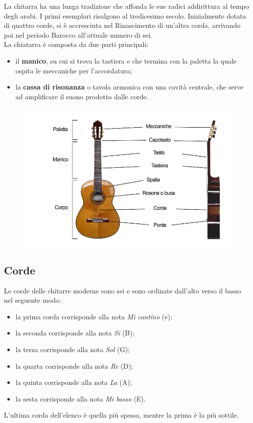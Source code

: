 La chitarra ha una lunga tradizione che affonda le sue radici addirittura al tempo degli arabi. I primi esemplari risalgono al tredicesimo secolo. Inizialmente dotata di quattro corde, si è accresciuta nel Rinascimento di un'altra corda, arrivando poi nel periodo Barocco all'attuale numero di sei.\\
\newline
La chiatarra è composta da due parti principali:
\begin{itemize}
	\item il \textbf{manico}, su cui si trova la tastiera e che termina con la paletta la quale ospita le meccaniche per l'accordatura;
	\item la \textbf{cassa di risonanza} o tavola armonica con una cavità centrale, che serve ad amplificare il suono prodotto dalle corde.
\end{itemize}

\begin{figure}[H]
	\centering
	\includegraphics[scale=0.50]{./images/img14.jpg}
\end{figure}

\subsection{Corde}
Le corde delle chitarre moderne sono sei e sono ordinate dall'alto verso il basso nel seguente modo:
\begin{itemize}
	\item la prima corda corrisponde alla nota \textit{Mi cantino} (e);
	\item la seconda corrisponde alla nota \textit{Si} (B);
	\item la terza corrisponde alla nota \textit{Sol} (G);
	\item la quarta corrisponde alla nota \textit{Re} (D);
	\item la quinta corrisponde alla nota \textit{La} (A);
	\item la sesta corrisponde alla nota \textit{Mi basso} (E).
\end{itemize}
L'ultima corda dell'elenco è quella più spessa, mentre la prima è la più sottile.
